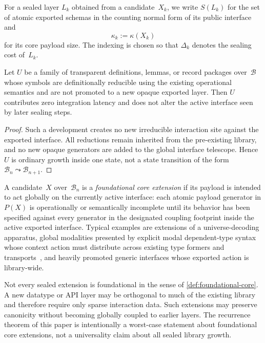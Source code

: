 \documentclass{lmcs}
\newcommand{\B}{\mathcal{B}}
\begin{document}
For a sealed layer $L_k$ obtained from a candidate~$X_k$, we write $S(L_k)$ for the set of atomic exported schemas in the counting normal form of its public interface and
\[
  \kappa_k := \kappa(X_k)
\]
for its core payload size. The indexing is chosen so that $\Delta_k$ denotes the sealing cost of~$L_k$.

\begin{prop}
\label{prop:transparent}
Let $U$ be a family of transparent definitions, lemmas, or record packages over~$\B$ whose symbols are definitionally reducible using the existing operational semantics and are not promoted to a new opaque exported layer. Then $U$ contributes zero integration latency and does not alter the active interface seen by later sealing steps.
\end{prop}

\begin{proof}
Such a development creates no new irreducible interaction site against the exported interface. All reductions remain inherited from the pre-existing library, and no new opaque generators are added to the global interface telescope. Hence $U$ is ordinary growth inside one state, not a state transition of the form $\B_n \leadsto \B_{n+1}$.
\end{proof}

\begin{defi}
\label{def:foundational-core}
A candidate~$X$ over~$\B_n$ is a \emph{foundational core extension} if its payload is intended to act globally on the currently active interface: each atomic payload generator in $P(X)$ is operationally or semantically incomplete until its behavior has been specified against every generator in the designated coupling footprint inside the active exported interface. Typical examples are extensions of a universe-decoding apparatus, global modalities presented by explicit modal dependent-type syntax whose context action must distribute across existing type formers and transports~\cite{birkedal-modal-dtt,aagaard-cubical-mtt}, and heavily promoted generic interfaces whose exported action is library-wide.
\end{defi}

\begin{rem}
\label{rem:orthogonal}
Not every sealed extension is foundational in the sense of \autoref{def:foundational-core}. A new datatype or API layer may be orthogonal to much of the existing library and therefore require only sparse interaction data. Such extensions may preserve canonicity without becoming globally coupled to earlier layers. The recurrence theorem of this paper is intentionally a worst-case statement about foundational core extensions, not a universality claim about all sealed library growth.
\end{rem}
\end{document}

